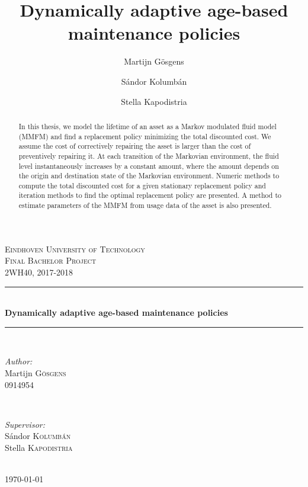 \documentclass[a4paper]{thesis}
\theoremstyle{definition}
\begin{document}
\frontmatter
\title{Dynamically adaptive age-based maintenance policies}
\author{Martijn G\"{o}sgens\\
\and
S\'{a}ndor Kolumb\'{a}n\\
\and
Stella Kapodistria
}
\begin{titlepage}

\newcommand{\HRule}{\rule{\linewidth}{0.5mm}} 

\center 
 

\textsc{\LARGE Eindhoven University of Technology}\\[1.5cm] 

\textsc{\Large Final Bachelor Project}\\[0.5cm] 
\textsc{\large 2WH40, 2017-2018}\\[0.5cm] 

\HRule \\[0.4cm]
{ \huge \bfseries Dynamically adaptive age-based maintenance policies}\\[0.4cm] 
\HRule \\[1.5cm]
 

\begin{minipage}{0.4\textwidth}
\begin{flushleft} \large
\emph{Author:}\\
Martijn \textsc{G\"{o}sgens}\\
0914954 
\end{flushleft}
\end{minipage}
~
\begin{minipage}{0.4\textwidth}
\begin{flushright} \large
\emph{Supervisor:} \\
S\'{a}ndor \textsc{Kolumb\'{a}n}\\ 
Stella \textsc{Kapodistria}
\end{flushright}
\end{minipage}\\[2cm]



{\large \today}\\[2cm] 


 

\vfill 

\end{titlepage} 

\begin{abstract}
	In this thesis, we model the lifetime of an asset as a Markov modulated fluid model (MMFM) and find a replacement policy minimizing the total discounted cost.
	We assume the cost of correctively repairing the asset is larger than the cost of preventively repairing it.
	At each transition of the Markovian environment, the fluid level instantaneously increases by a constant amount, where the amount depends on the origin and destination state of the Markovian environment.
	Numeric methods to compute the total discounted cost for a given stationary replacement policy and iteration methods to find the optimal replacement policy are presented.
	A method to estimate parameters of the MMFM from usage data of the asset is also presented.
\end{abstract}
\end{document}
